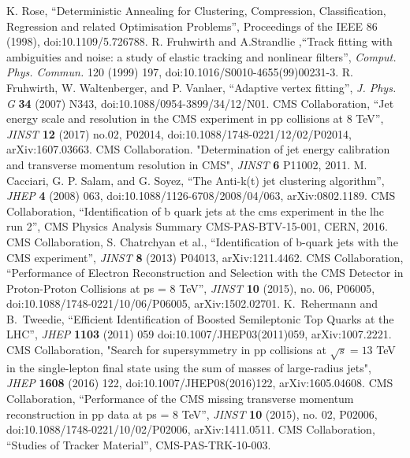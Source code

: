 \begin{thebibliography}{9}
K. Rose, “Deterministic Annealing for Clustering, Compression, Classification, Regression and related Optimisation Problems”, Proceedings of the IEEE 86 (1998), doi:10.1109/5.726788.
R. Fruhwirth and A.Strandlie ,“Track fitting with ambiguities and noise: a study of elastic tracking and nonlinear filters”, {\it Comput. Phys. Commun.} 120 (1999) 197, doi:10.1016/S0010-4655(99)00231-3.
R. Fruhwirth, W. Waltenberger, and P. Vanlaer, “Adaptive vertex fitting”, {\it J. Phys. G} {\bf 34} (2007) N343, doi:10.1088/0954-3899/34/12/N01.
CMS Collaboration, ``Jet energy scale and resolution in the CMS experiment in pp collisions at 8 TeV'', {\it JINST} {\bf 12} (2017) no.02,  P02014, doi:10.1088/1748-0221/12/02/P02014, arXiv:1607.03663.
CMS Collaboration. "Determination of jet energy calibration and transverse momentum resolution in CMS", {\it JINST} {\bf 6} P11002, 2011.
M. Cacciari, G. P. Salam, and G. Soyez, “The Anti-k(t) jet clustering algorithm”, {\it JHEP} {\bf 4} (2008) 063, doi:10.1088/1126-6708/2008/04/063, arXiv:0802.1189.
CMS Collaboration, “Identification of b quark jets at the cms experiment in the lhc run 2”, CMS Physics Analysis Summary CMS-PAS-BTV-15-001, CERN, 2016.
CMS Collaboration, S. Chatrchyan et al., “Identification of b-quark jets with the CMS experiment”, {\it JINST} {\bf 8} (2013) P04013, arXiv:1211.4462.
CMS Collaboration, “Performance of Electron Reconstruction and Selection with the CMS Detector in Proton-Proton Collisions at ps = 8 TeV”, {\it JINST} \textbf{10} (2015), no. 06, P06005, doi:10.1088/1748-0221/10/06/P06005, arXiv:1502.02701.
K.~Rehermann and B.~Tweedie, ``Efficient Identification of Boosted Semileptonic Top Quarks at the LHC'', {\it JHEP} {\bf 1103} (2011) 059 doi:10.1007/JHEP03(2011)059, arXiv:1007.2221.
CMS Collaboration, "Search for supersymmetry in pp collisions at $ \sqrt{s}=13 $ TeV in the single-lepton final state using the sum of masses of large-radius jets", {\it JHEP} {\bf 1608} (2016) 122, doi:10.1007/JHEP08(2016)122, arXiv:1605.04608.
CMS Collaboration, “Performance of the CMS missing transverse momentum reconstruction in pp data at ps = 8 TeV”, {\it JINST} \textbf{10} (2015), no. 02, P02006, doi:10.1088/1748-0221/10/02/P02006, arXiv:1411.0511.
CMS Collaboration, ``Studies of Tracker Material'', CMS-PAS-TRK-10-003.

\end{thebibliography}
